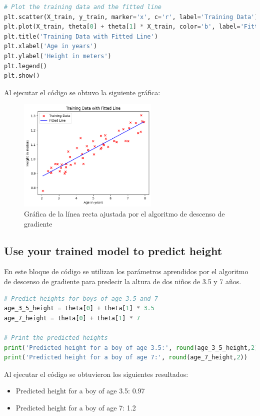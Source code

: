 \documentclass{article}
\begin{document}
\begin{lstlisting}[language=Python, caption={Gráfica de la línea recta ajustada por el algoritmo de descenso de gradiente},label={lst:PlotStraightLineFit}]
# Plot the training data and the fitted line
plt.scatter(X_train, y_train, marker='x', c='r', label='Training Data')
plt.plot(X_train, theta[0] + theta[1] * X_train, color='b', label='Fitted Line')
plt.title('Training Data with Fitted Line')
plt.xlabel('Age in years')
plt.ylabel('Height in meters')
plt.legend()
plt.show()
\end{lstlisting}
\noindent
Al ejecutar el código se obtuvo la siguiente gráfica:
\begin{figure}[h]
\centering
\includegraphics[width=0.6\textwidth]{img/plot_straight_line_fit}
\caption{Gráfica de la línea recta ajustada por el algoritmo de descenso de gradiente}
\label{fig:plot_straight_line_fit}
\end{figure}
\subsection{Use your trained model to predict height   }\label{ssec:Predict-Height}
En este bloque de código se utilizan los parámetros aprendidos por el algoritmo de descenso de gradiente para predecir la altura de dos niños de 3.5 y 7 años.
\begin{lstlisting}[language=Python, caption={Predicción de la altura de dos niños de 3.5 y 7 años},label={lst:PredictHeight}]
# Predict heights for boys of age 3.5 and 7
age_3_5_height = theta[0] + theta[1] * 3.5
age_7_height = theta[0] + theta[1] * 7

# Print the predicted heights
print('Predicted height for a boy of age 3.5:', round(age_3_5_height,2))
print('Predicted height for a boy of age 7:', round(age_7_height,2))
\end{lstlisting}
\noindent
Al ejecutar el código se obtuvieron los siguientes resultados:
\begin{itemize}
\item Predicted height for a boy of age 3.5: 0.97
\item Predicted height for a boy of age 7: 1.2
\end{itemize}
\end{document}
